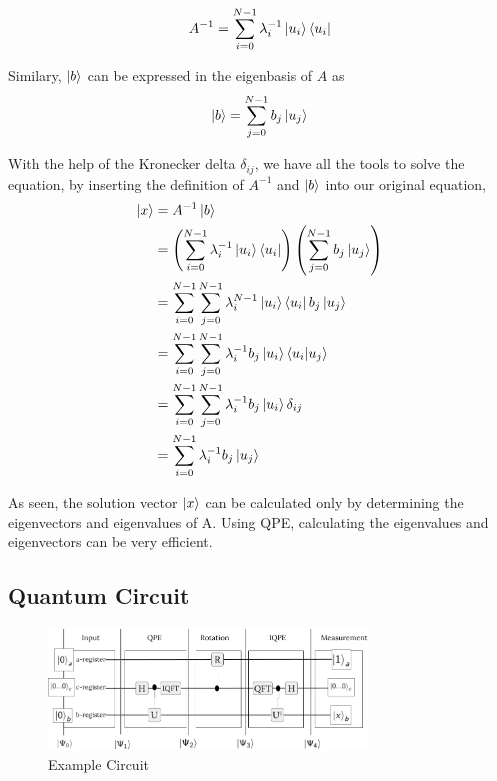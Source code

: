 \begin{equation}
A^{-1} = \sum_{i=0}^{N-1} \lambda_i^{-1} \ket{u_i}\bra{u_i}
\end{equation}

Similary, $\ket b$ can be expressed in the eigenbasis of $A$ as 
\begin{equation}
\ket{b} = \sum_{j=0}^{N-1} b_j\ket{u_j}
\end{equation}

With the help of the Kronecker delta $\delta_{ij}$, we have all the tools to solve the equation, by inserting the definition of $A^{-1}$ and $\ket b$ into our original equation,
\begin{equation}
\begin{split}
\ket{x} &= A^{-1} \ket{b}\\
&=\left(\sum_{i=0}^{N-1} \lambda_i^{-1} \ket{u_i}\bra{u_i} \right) \left(\sum_{j=0}^{N-1} b_j\ket{u_j} \right) \\
&=\sum_{i=0}^{N-1} \sum_{j=0}^{N-1} \lambda_i^{N-1} \ket{u_i}\bra{u_i} b_j\ket{u_j}\\
&=\sum_{i=0}^{N-1} \sum_{j=0}^{N-1} \lambda_i^{-1} b_j\ket{u_i}\braket{u_i| u_j}\\
&=\sum_{i=0}^{N-1} \sum_{j=0}^{N-1} \lambda_i^{-1} b_j\ket{u_i}\delta_{ij}\\
&=\sum_{i=0}^{N-1} \lambda_i^{-1} b_j\ket{u_j}\\
\end{split}
\end{equation}

As seen, the solution vector $\ket x$ can be calculated only by determining the eigenvectors and eigenvalues of A. 
Using QPE, calculating the eigenvalues and eigenvectors can be very efficient.

\subsection{Quantum Circuit}

\begin{figure}
    \centering
    \includegraphics[width=8.5cm]{img/example_circuit_cropped.png}
    \caption{Example Circuit}
    \label{ex_circ}
\end{figure}

